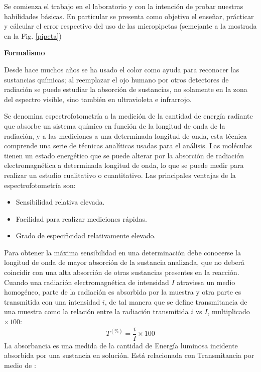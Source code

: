 
Se comienza el trabajo en el laboratorio y con la intención de probar nuestras habilidades básicas. En particular se presenta como objetivo el enseñar, prácticar y cálcular el error respectivo del uso de las micropipetas (semejante a la mostrada en la Fig. \ref{pipeta})

\textbf{\textcolor{azul50}{Formalismo}}

Desde hace muchos años se ha usado el color como ayuda para reconocer las sustancias químicas; al  reemplazar  el  ojo  humano  por  otros  detectores  de  radiación  se  puede  estudiar  la  absorción  de sustancias, no solamente en la zona del espectro visible, sino también en ultravioleta e infrarrojo. 

Se  denomina  espectrofotometría  a  la  medición  de  la  cantidad  de  energía  radiante  que  absorbe  un sistema  químico  en  función  de  la  longitud  de  onda  de  la  radiación,  y  a  las  mediciones  a  una determinada longitud de onda, esta técnica comprende una serie de técnicas analíticas usadas para el análisis. Las moléculas tienen un estado energético que se puede alterar por la absorción de radiación electromagnética a determinada longitud de onda, lo que se puede medir para realizar un estudio cualitativo o cuantitativo. Las principales ventajas de la espectrofotometría son:\\[-.6cm]
\begin{itemize}
    \item Sensibilidad relativa elevada.\\[-.6cm]
    \item Facilidad para realizar mediciones rápidas.\\[-.6cm]
    \item Grado de especificidad relativamente elevado. 
\end{itemize}
Para obtener la máxima sensibilidad en una determinación debe conocerse la longitud de onda de mayor absorción de la sustancia analizada, que no deberá coincidir con una alta absorción de otras sustancias presentes en la reacción.
Cuando una radiación electromagnética de intensidad $I$ atraviesa un medio homogéneo, parte de la radiación es absorbida por la muestra y otra parte es transmitida con una intensidad $i$, de tal manera que se define transmitancia de una muestra como la relación entre la radiación transmitida $i$ vs $I$, multiplicado $\times 100$: 
\begin{equation}
    T^{(\%)} = \dfrac{i}{I}\times 100
\end{equation}
La absorbancia es una medida de la cantidad de Energía luminosa incidente absorbida por una sustancia en solución. Está relacionada con Transmitancia por medio de : 
